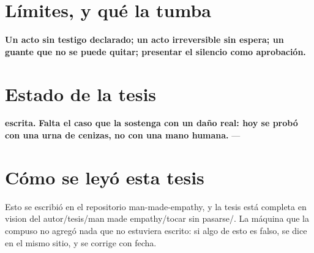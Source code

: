 \documentclass[11pt,a4paper]{article}
\begin{document}
\section{Límites, y qué la tumba}
\textbf{Un acto sin testigo declarado; un acto irreversible sin espera; un guante que no se puede quitar; presentar el silencio como aprobación.}

\section{Estado de la tesis}
\textbf{escrita.} \textbf{Falta el caso que la sostenga con un daño real: hoy se probó con una urna de cenizas, no con una mano humana.} ---

\section*{Cómo se leyó esta tesis}
Esto se escribió en el repositorio man-made-empathy, y la tesis está completa en vision del autor/tesis/man made empathy/tocar sin pasarse/. La máquina que la compuso no agregó nada que no estuviera escrito: si algo de esto es falso, se dice en el mismo sitio, y se corrige con fecha.
\end{document}
